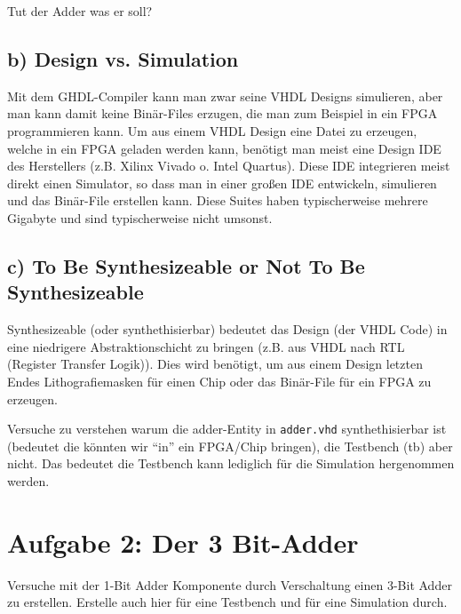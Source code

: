 \documentclass[a4paper]{scrartcl}
\begin{document}
Tut der Adder was er soll?

\subsection*{b) Design vs. Simulation}
Mit dem GHDL-Compiler kann man zwar seine VHDL Designs simulieren, aber man kann damit keine Binär-Files erzugen, die man zum Beispiel in ein FPGA programmieren kann. 
Um aus einem VHDL Design eine Datei zu erzeugen, welche in ein FPGA geladen werden kann, benötigt man meist eine Design IDE des Herstellers (z.B. Xilinx Vivado o.
Intel Quartus). Diese IDE integrieren meist direkt einen Simulator, so dass man in einer großen IDE entwickeln, simulieren und das Binär-File erstellen kann. Diese
Suites haben typischerweise mehrere Gigabyte und sind typischerweise nicht umsonst.

\subsection*{c) To Be Synthesizeable or Not To Be Synthesizeable}
Synthesizeable (oder synthethisierbar) bedeutet das Design (der VHDL Code) in eine niedrigere Abstraktionschicht zu bringen (z.B. aus VHDL nach RTL (Register Transfer Logik)). Dies wird
benötigt, um aus einem Design letzten Endes Lithografiemasken für einen Chip oder das Binär-File für ein FPGA zu erzeugen. 

Versuche zu verstehen warum die adder-Entity in \texttt{adder.vhd} synthethisierbar ist (bedeutet die könnten wir ``in'' ein FPGA/Chip bringen), die Testbench (tb) aber nicht.
Das bedeutet die Testbench kann lediglich für die Simulation hergenommen werden.

\section*{Aufgabe 2: Der 3 Bit-Adder}
Versuche mit der 1-Bit Adder Komponente durch Verschaltung einen 3-Bit Adder zu erstellen. Erstelle auch hier für eine Testbench und für eine Simulation durch.
\end{document}
